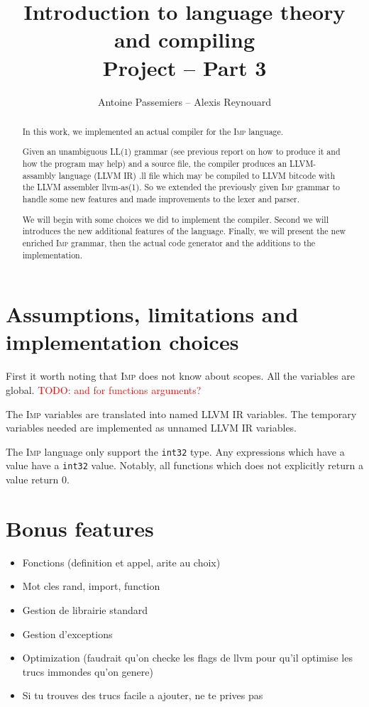 \documentclass[11pt]{article}
\title{Introduction to language theory and compiling \\ Project -- Part 3}
\author{Antoine Passemiers -- Alexis Reynouard}
\newcommand\todo[1]{\textcolor{red}{TODO: #1}}
\newcommand\imp{\textsc{Imp}\xspace}
\newcommand\inttt{\texttt{int32}\xspace}
\begin{document}
\maketitle
\thispagestyle{empty}

\vfill
\begin{abstract}
In this work, we implemented an actual compiler for the \imp language.

Given an unambiguous LL(1) grammar (see previous report on how to produce it and how the program may help)
and a source file, the compiler produces an LLVM-assambly language (LLVM IR) .ll file which may be compiled to LLVM
bitcode with the LLVM assembler \textsf{llvm-as(1)}.
So we extended the previously given \imp grammar to handle some new features
and made improvements to the lexer and parser.

We will begin with some choices we did to implement the compiler.
Second we will introduces the new additional features of the language.
Finally, we will present the new enriched \imp grammar,
then the actual code generator and the additions to the implementation.
\end{abstract}

\vfill
\tableofcontents

\vfill
\clearpage
\setcounter{page}{1}

\section{Assumptions, limitations and implementation choices}

First it worth noting that \imp does not know about scopes.
All the variables are global. \todo{and for functions arguments?}

The \imp variables are translated into named LLVM IR variables.
The temporary variables needed are implemented as unnamed LLVM IR variables.

The \imp language only support the \inttt type.
Any expressions which have a value have a \inttt value.
Notably, all functions which does not explicitly return a value return 0.

\section{Bonus features}

\begin{itemize}
\item Fonctions (definition et appel, arite au choix)
\item Mot cles rand, import, function
\item Gestion de librairie standard
\item Gestion d'exceptions
\item Optimization (faudrait qu'on checke les flags de llvm pour qu'il optimise les trucs immondes qu'on genere)
\item Si tu trouves des trucs facile a ajouter, ne te prives pas
\end{itemize}
\end{document}
